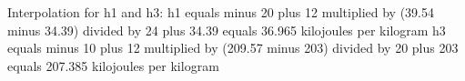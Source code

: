 Interpolation for h1 and h3:  
h1 equals minus 20 plus 12 multiplied by (39.54 minus 34.39) divided by 24 plus 34.39 equals 36.965 kilojoules per kilogram  
h3 equals minus 10 plus 12 multiplied by (209.57 minus 203) divided by 20 plus 203 equals 207.385 kilojoules per kilogram